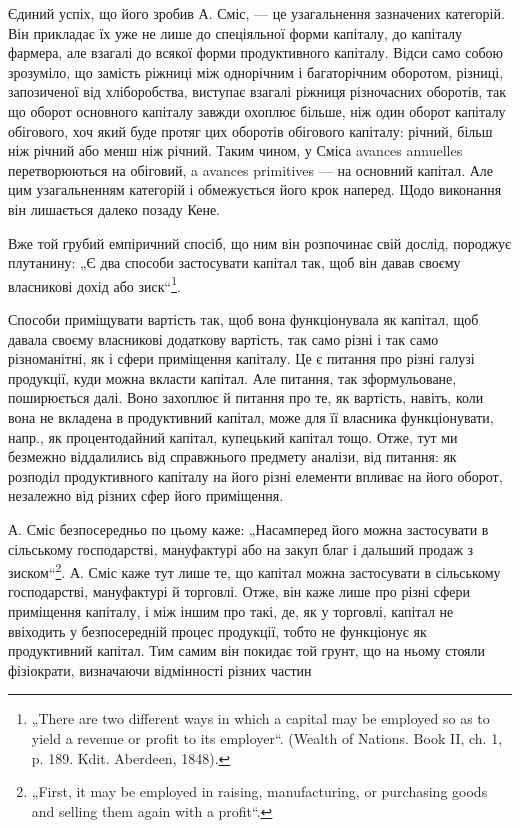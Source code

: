 Єдиний успіх, що його зробив А. Сміс, — це узагальнення зазначених
категорій. Він прикладає їх уже не лише до спеціяльної форми капіталу,
до капіталу фармера, але взагалі до всякої форми продуктивного капіталу.
Відси само собою зрозуміло, що замість ріжниці між однорічним і багаторічним
оборотом, різниці, запозиченої від хліборобства, виступає взагалі
ріжниця різночасних оборотів, так що оборот основного капіталу завжди
охоплює більше, ніж один оборот капіталу обігового, хоч який буде
протяг цих оборотів обігового капіталу: річний, більш ніж річний або
менш ніж річний. Таким чином, у Сміса avances annuelles перетворюються
на обіговий, a avances primitives — на основний капітал. Але цим узагальненням
категорій і обмежується його крок наперед. Щодо виконання він
лишається далеко позаду Кене.

Вже той грубий емпіричний спосіб, що ним він розпочинає свій дослід,
породжує плутанину: „Є два способи застосувати капітал так, щоб
він давав своєму власникові дохід або зиск“\footnote*{
„There are two different ways in which a capital may be employed so as to
yield a revenue or profit to its employer“. (Wealth of Nations. Book II, ch. 1, p. 189.
Kdit. Aberdeen, 1848).
}.

Способи приміщувати вартість так, щоб вона функціонувала як капітал,
щоб давала своєму власникові додаткову вартість, так само різні
і так само різноманітні, як і сфери приміщення капіталу. Це є питання
про різні галузі продукції, куди можна вкласти капітал. Але питання, так
зформульоване, поширюється далі. Воно захоплює й питання про те, як
вартість, навіть, коли вона не вкладена в продуктивний капітал, може для
її власника функціонувати, напр., як процентодайний капітал, купецький
капітал тощо. Отже, тут ми безмежно віддалились від справжнього предмету
аналізи, від питання: як розподіл продуктивного капіталу на
його різні елементи впливає на його оборот, незалежно від різних сфер
його приміщення.

А. Сміс безпосередньо по цьому каже: „Насамперед його можна застосувати
в сільському господарстві, мануфактурі або на закуп благ і дальший
продаж з зиском“\footnote*{
„First, it may be employed in raising, manufacturing, or purchasing goods and
selling them again with a profit“.
}. А. Сміс каже тут лише те, що капітал можна
застосувати в сільському господарстві, мануфактурі й торговлі. Отже, він
каже лише про різні сфери приміщення капіталу, і між іншим про такі, де,
як у торговлі, капітал не ввіходить у безпосередній процес продукції, тобто
не функціонує як продуктивний капітал. Тим самим він покидає той грунт,
що на ньому стояли фізіократи, визначаючи відмінності різних частин

